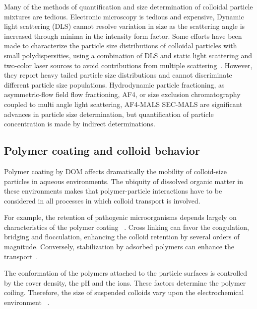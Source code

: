 \documentclass[journal=langd5,manuscript=article]{achemso}
\begin{document}
Many of the methods of quantification and size determination of colloidal particle mixtures are tedious. Electronic microscopy is tedious and expensive,
Dynamic light scattering (DLS)  cannot resolve variation in size as the scattering angle is increased through minima in the intensity form factor. Some efforts have been made to characterize the particle size distributions of colloidal particles with small polydispersities, using a combination of DLS and static light scattering and two-color laser sources to avoid contributions from multiple scattering~\cite{Bryant2003AccurateSuspensions}. However, they report heavy tailed particle size distributions and cannot discriminate different particle size populations.
Hydrodynamic particle fractioning, as asymmetric-flow field flow fractioning, AF4, or size exclusion chromatography coupled to multi angle light scattering, AF4-MALS  SEC-MALS are significant advances in particle size determination, but quantification of particle concentration is made by indirect determinations.



\subsection{Polymer coating and colloid behavior}

Polymer coating by DOM affects dramatically the mobility of colloid-size particles in aqueous environments. The ubiquity of dissolved organic matter in these environments makes that polymer-particle interactions have to be considered in all processes in which colloid transport is involved.

For example, the retention of pathogenic microorganisms depends largely on characteristics of the polymer coating~\cite{Morales2011a} . Cross linking can favor the coagulation, bridging and flocculation, enhancing the colloid retention by several orders of magnitude. Conversely,  stabilization by adsorbed polymers can enhance the transport~\cite{Keller2010}.

The conformation of the polymers attached to the particle surfaces is controlled by the cover density, the pH and the ions. These factors determine the polymer coiling. Therefore, the size of suspended colloids vary upon the electrochemical environment~\cite{Morales2011a} .
\end{document}
